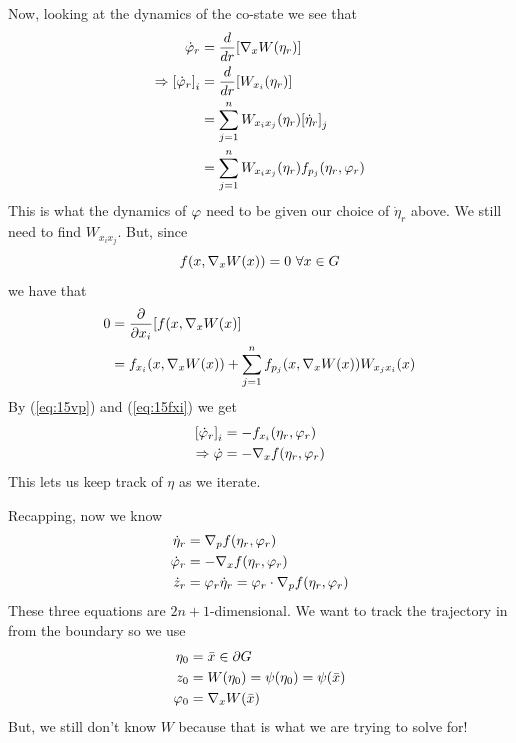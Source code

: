 Now, looking at the dynamics of the co-state we see that
\begin{align}
\label{eq:15vp}
\dot{\varphi}_r &= \frac{d}{dr}[\nabla_xW(\eta_r)] \nonumber \\
\Rightarrow {[\dot{\varphi}_r]}_i &= \frac{d}{dr}[W_{x_i}(\eta_r)] \nonumber \\
&= \sum_{j=1}^n W_{x_i x_j}(\eta_r){[\dot{\eta}_r]}_j \nonumber \\
&= \sum_{j=1}^n W_{x_i x_j}(\eta_r)f_{p_j}(\eta_r,\varphi_r)
\end{align}
This is what the dynamics of $\varphi$ need to be given our choice of $\dot{\eta}_r$ above.
We still need to find $W_{x_i x_j}$.
But, since
$$f(x,\nabla_xW(x)) = 0~\forall x\in G$$
we have that
\begin{align}
\label{eq:15fxi}
0 &= \frac{\partial}{\partial x_i}[f(x,\nw(x)] \nonumber \\%
&= f_{x_i}(x,\nw(x)) + \sum_{j=1}^n f_{p_j}(x,\nw(x))W_{x_j x_i}(x)
\end{align}
By (\ref{eq:15vp}) and (\ref{eq:15fxi}) we get
\begin{align*}
{[\dot{\varphi}_r]}_i &= -f_{x_i}(\eta_r,\varphi_r) \\
\Rightarrow \dot{\varphi} &= -\nabla_x f(\eta_r,\varphi_r)
\end{align*}
This lets us keep track of $\eta$ as we iterate.

Recapping, now we know
\begin{align*}
\dot{\eta}_r &= \nabla_p f(\eta_r,\varphi_r) \\
\dot{\varphi}_r &= -\nabla_x f(\eta_r,\varphi_r) \\
\dot{z}_r &= \varphi_r\dot{\eta}_r = \varphi_r\cdot \nabla_p f(\eta_r,\varphi_r)
\end{align*}
These three equations are $2n+1$-dimensional.
We want to track the trajectory in from the boundary so we use
\begin{align*}
\eta_0 &= \bar{x} \in \partial G \\
z_0 &= W(\eta_0) = \psi(\eta_0) = \psi(\bar{x}) \\
\varphi_0 &= \nabla_xW(\bar{x})
\end{align*}
But, we still don't know $W$ because that is what we are trying to solve for!


